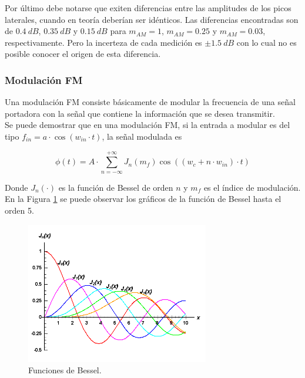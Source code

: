 \documentclass[a4paper,10pt]{article}
\begin{document}
		\indent Por \'ultimo debe notarse que exiten diferencias entre las 
		amplitudes de los picos laterales, cuando en teor\'ia deber\'ian ser 
		id\'enticos. Las diferencias encontradas son de $0.4~dB$, $0.35~dB$ y 
		$0.15~dB$ para $m_{AM}=1$, $m_{AM}=0.25$ y $m_{AM}=0.03$, 
		respectivamente. Pero la incerteza de cada medici\'on es $\pm1.5~dB$ con
		lo cual no es posible conocer el origen de esta diferencia.

		\subsubsection{Modulaci\'on FM}
		\indent Una modulaci\'on FM consiste b\'asicamente de modular la 
		frecuencia de una se\~nal portadora con la se\~nal que contiene la 
		informaci\'on que se desea transmitir. \\ 
		\indent Se puede demostrar que en una modulaci\'on FM, si la entrada a 
		modular es del tipo $f_{in}=a\cdot \cos(w_{in}\cdot t)$, la se\~nal 
		modulada es 
		
		$$\phi(t)=A\cdot\sum_{n=-\infty}^{+\infty}J_n(m_f)\cos((w_c+n\cdot 
		w_{in})\cdot t)$$
		
		\indent Donde $J_n(\cdot)$ es la funci\'on de Bessel de orden $n$ y 
		$m_f$ es el \'indice de modulaci\'on. En la Figura \ref{bessel} se puede
		observar los gr\'aficos de la funci\'on de Bessel hasta el orden 5.
		
		\begin{figure}[!htb]
				\centering
				\includegraphics[width=8cm]
				{Imagenes/bessel.png}
				\caption{Funciones de Bessel.}
				\label{bessel} 
		\end{figure}
		
\end{document}
